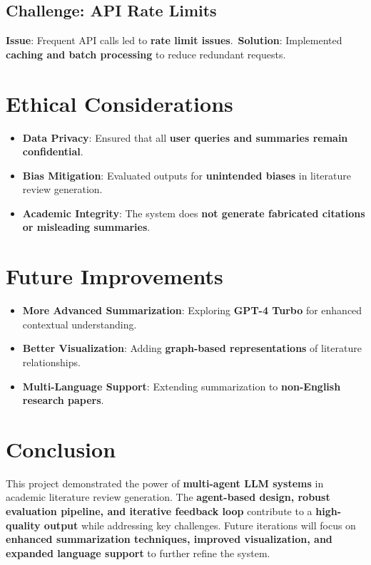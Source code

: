 \subsection{Challenge: API Rate Limits}
\textbf{Issue}: Frequent API calls led to \textbf{rate limit issues}.\
\textbf{Solution}: Implemented \textbf{caching and batch processing} to reduce redundant requests.

\section{Ethical Considerations}
\begin{itemize}
\item \textbf{Data Privacy}: Ensured that all \textbf{user queries and summaries remain confidential}.
\item \textbf{Bias Mitigation}: Evaluated outputs for \textbf{unintended biases} in literature review generation.
\item \textbf{Academic Integrity}: The system does \textbf{not generate fabricated citations or misleading summaries}.
\end{itemize}

\section{Future Improvements}
\begin{itemize}
\item \textbf{More Advanced Summarization}: Exploring \textbf{GPT-4 Turbo} for enhanced contextual understanding.
\item \textbf{Better Visualization}: Adding \textbf{graph-based representations} of literature relationships.
\item \textbf{Multi-Language Support}: Extending summarization to \textbf{non-English research papers}.
\end{itemize}

\section{Conclusion}
This project demonstrated the power of \textbf{multi-agent LLM systems} in academic literature review generation. The \textbf{agent-based design, robust evaluation pipeline, and iterative feedback loop} contribute to a \textbf{high-quality output} while addressing key challenges. Future iterations will focus on \textbf{enhanced summarization techniques, improved visualization, and expanded language support} to further refine the system.

